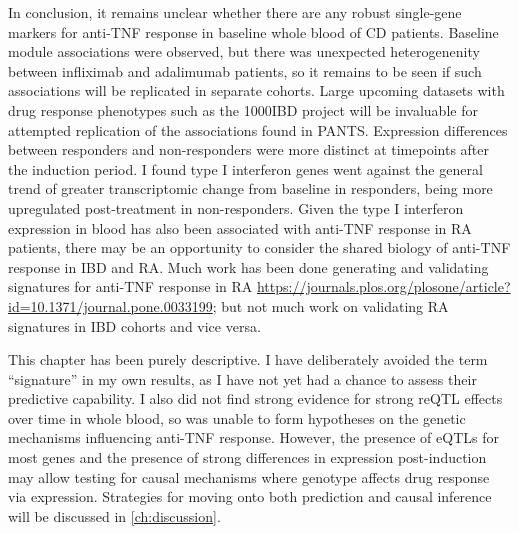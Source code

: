 In conclusion,
it remains unclear whether there are any robust single-gene markers for anti-\gls{TNF} response in baseline whole blood of \gls{CD} patients.
Baseline module associations were observed, but there was unexpected heterogenenity between infliximab and adalimumab patients,
so it remains to be seen if such associations will be replicated in separate cohorts.
Large upcoming datasets with drug response phenotypes such as the 1000IBD project \autocite{imhann20191000IBDProjectMultiomics} will be invaluable for attempted replication of the associations found in \gls{PANTS}.
Expression differences between responders and non-responders were more distinct at timepoints after the induction period.
I found type I interferon genes went against the general trend of greater transcriptomic change from baseline in responders,
being more upregulated post-treatment in non-responders.
Given the type I interferon expression in blood has also been associated with anti-\gls{TNF} response in \gls{RA} patients,
there may be an opportunity to consider the shared biology of anti-\gls{TNF} response in \gls{IBD} and \gls{RA}.
Much work has been done generating and validating signatures for anti-\gls{TNF} response in \gls{RA} \url{https://journals.plos.org/plosone/article?id=10.1371/journal.pone.0033199}; but not much work on validating \gls{RA} signatures in \gls{IBD} cohorts and vice versa.

This chapter has been purely descriptive.
I have deliberately avoided the term \enquote{signature} in my own results, 
as I have not yet had a chance to assess their predictive capability.
I also did not find strong evidence for strong \gls{reQTL} effects over time in whole blood, 
so was unable to form hypotheses on the genetic mechanisms influencing anti-\gls{TNF} response.
However, the presence of \glspl{eQTL} for most genes and the presence of strong differences in expression post-induction may allow testing for causal mechanisms where genotype affects drug response via expression.
Strategies for moving onto both prediction and causal inference will be discussed in \autoref{ch:discussion}.



